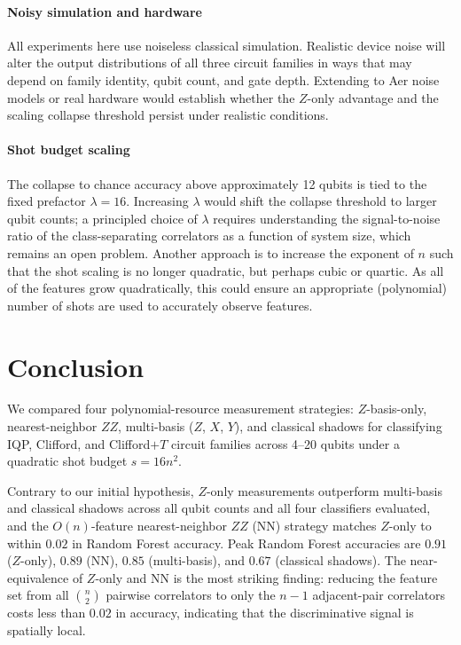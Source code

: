 \documentclass[conference]{IEEEtran}
\newcommand{\nqubits}{n}
\newcommand{\shots}{s}
\begin{document}
\paragraph{Noisy simulation and hardware}
All experiments here use noiseless classical simulation.
Realistic device noise will alter the output distributions of all three circuit families in ways that may depend on family identity, qubit count, and gate depth.
Extending to Aer noise models or real hardware would establish whether the $Z$-only advantage and the scaling collapse threshold persist under realistic conditions.

\paragraph{Shot budget scaling}
The collapse to chance accuracy above approximately 12 qubits is tied to the fixed prefactor $\lambda = 16$.
Increasing $\lambda$ would shift the collapse threshold to larger qubit counts; a principled choice of $\lambda$ requires understanding the signal-to-noise ratio of the class-separating correlators as a function of system size, which remains an open problem.
Another approach is to increase the exponent of $\nqubits$ such that the shot scaling is no longer quadratic, but perhaps cubic or quartic. As all of the 
features grow quadratically, this could ensure an appropriate (polynomial) number of shots are used to accurately observe features.

\section{Conclusion}
\label{sec:conclusion}

We compared four polynomial-resource measurement strategies: $Z$-basis-only, nearest-neighbor $ZZ$, multi-basis ($Z$, $X$, $Y$), and classical shadows for classifying IQP, Clifford, and Clifford$+T$ circuit families across 4--20 qubits under a quadratic shot budget $\shots = 16\nqubits^2$.

Contrary to our initial hypothesis, $Z$-only measurements outperform multi-basis and classical shadows across all qubit counts and all four classifiers evaluated, and the $O(\nqubits)$-feature nearest-neighbor $ZZ$ (NN) strategy matches $Z$-only to within $0.02$ in Random Forest accuracy.
Peak Random Forest accuracies are $0.91$ ($Z$-only), $0.89$ (NN), $0.85$ (multi-basis), and $0.67$ (classical shadows).
The near-equivalence of $Z$-only and NN is the most striking finding: reducing the feature set from all $\binom{\nqubits}{2}$ pairwise correlators to only the $\nqubits - 1$ adjacent-pair correlators costs less than $0.02$ in accuracy, indicating that the discriminative signal is spatially local.
\end{document}
